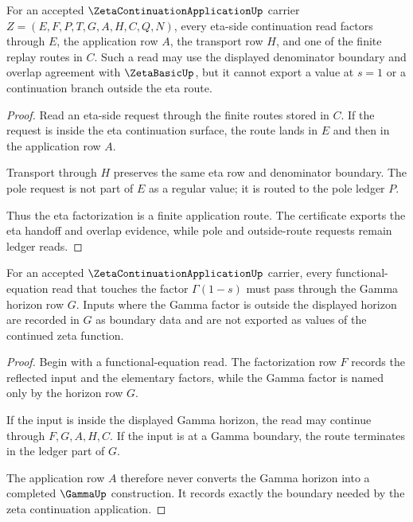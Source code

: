 \begin{theorem}
\label{thm:zeta-continuation-application-eta-factorization}
For an accepted $\ZetaContinuationApplicationUp$ carrier $Z=(E,F,P,T,G,A,H,C,Q,N)$, every eta-side continuation read factors through $E$, the application row $A$, the transport row $H$, and one of the finite replay routes in $C$. Such a read may use the displayed denominator boundary and overlap agreement with $\ZetaBasicUp$, but it cannot export a value at $s=1$ or a continuation branch outside the eta route.
\end{theorem}
\begin{proof}
Read an eta-side request through the finite routes stored in $C$. If the request is inside the eta continuation surface, the route lands in $E$ and then in the application row $A$.

Transport through $H$ preserves the same eta row and denominator boundary. The pole request is not part of $E$ as a regular value; it is routed to the pole ledger $P$.

Thus the eta factorization is a finite application route. The certificate exports the eta handoff and overlap evidence, while pole and outside-route requests remain ledger reads.
\end{proof}

\begin{theorem}
\label{thm:zeta-continuation-application-gamma-horizon-boundary}
For an accepted $\ZetaContinuationApplicationUp$ carrier, every functional-equation read that touches the factor $\Gamma(1-s)$ must pass through the Gamma horizon row $G$. Inputs where the Gamma factor is outside the displayed horizon are recorded in $G$ as boundary data and are not exported as values of the continued zeta function.
\end{theorem}
\begin{proof}
Begin with a functional-equation read. The factorization row $F$ records the reflected input and the elementary factors, while the Gamma factor is named only by the horizon row $G$.

If the input is inside the displayed Gamma horizon, the read may continue through $F,G,A,H,C$. If the input is at a Gamma boundary, the route terminates in the ledger part of $G$.

The application row $A$ therefore never converts the Gamma horizon into a completed $\GammaUp$ construction. It records exactly the boundary needed by the zeta continuation application.
\end{proof}

